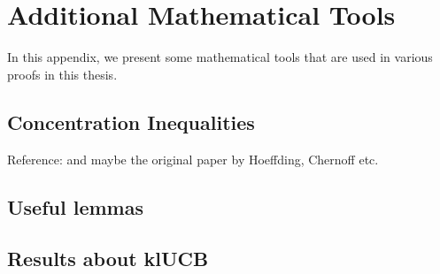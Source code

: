 \chapter{Additional Mathematical Tools}
\label{app:1:mathsTools}

In this appendix, we present some mathematical tools that are used in various proofs in this thesis.

\section{Concentration Inequalities}
\label{sec:app1:ConcentrationInequalities}


Reference: \cite{Boucheron2013} and maybe the original paper by Hoeffding, Chernoff etc.


\section{Useful lemmas}
\label{sec:app1:UsefulLemmas}



\section{Results about klUCB}
\label{sec:app1:resultsklUCB}

